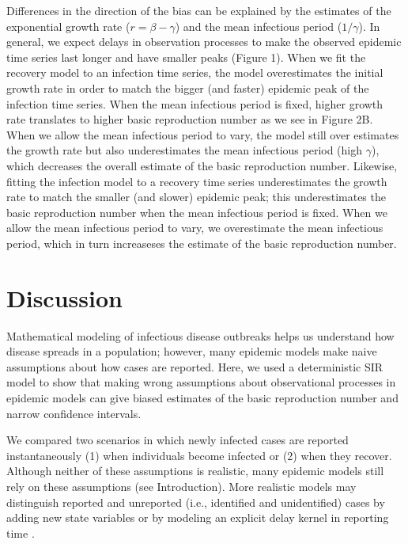 \documentclass{article}\usepackage[]{graphicx}\usepackage[]{color}
\begin{document}
Differences in the direction of the bias can be explained by the estimates of the
exponential growth rate ($r = \beta - \gamma$) and the mean infectious period ($1/\gamma$).
In general, we expect delays in observation processes to make the observed epidemic 
time series last longer and have smaller peaks (Figure 1).
When we fit the recovery model to an infection time series, the model overestimates
the initial growth rate in order to match the bigger (and faster) epidemic peak of the 
infection time series. When the mean infectious period is fixed, higher growth rate
translates to higher basic reproduction number as we see in Figure 2B. When we allow
the mean infectious period to vary, the model still over estimates the growth rate but
also underestimates the mean infectious period (high $\gamma$), 
which decreases the overall estimate of the basic reproduction number.
Likewise, fitting the infection model to a recovery time series underestimates
the growth rate to match the smaller (and slower) epidemic peak; this 
underestimates the basic reproduction number when the mean infectious period is fixed. 
When we allow the mean infectious period to vary, we overestimate the mean infectious
period, which in turn increaseses the estimate of the basic reproduction number.

\section{Discussion}

Mathematical modeling of infectious disease outbreaks helps us understand 
how disease spreads in a population; however, many epidemic models make 
naive assumptions about how cases are reported. 
Here, we used a deterministic SIR model to show that 
making wrong assumptions about observational processes in epidemic models
can give biased estimates of the basic reproduction number and narrow
confidence intervals.

We compared two scenarios in which newly infected cases are reported 
instantaneously (1) when individuals become infected or
(2) when they recover. Although neither of these
assumptions is realistic, many epidemic models still rely on these
assumptions (see Introduction). 
More realistic models may distinguish reported and unreported
(i.e., identified and unidentified) cases by adding
new state variables \citep{browne2015modeling,webb2015model} 
or by modeling an explicit delay kernel in reporting time 
\citep{harris1990reporting, ferguson2001foot, ster2009epidemiological, 
birrell2011bayesian, funk2018real}.
\end{document}

